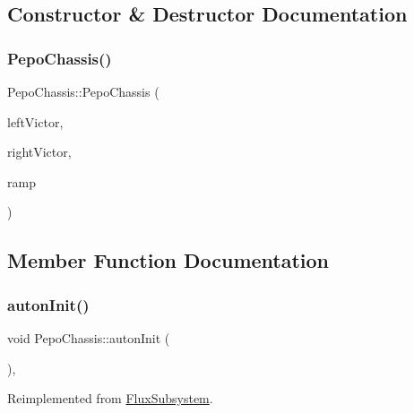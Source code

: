 \subsection{Constructor \& Destructor Documentation}
\mbox{\label{classPepoChassis_a7671239e4338a851b31322b743e1d648}} 
\subsubsection{\texorpdfstring{Pepo\+Chassis()}{PepoChassis()}}
{\footnotesize\ttfamily Pepo\+Chassis\+::\+Pepo\+Chassis (\begin{DoxyParamCaption}\item[{Victor\+S\+PX \&}]{left\+Victor,  }\item[{Victor\+S\+PX \&}]{right\+Victor,  }\item[{double}]{ramp }\end{DoxyParamCaption})}



\subsection{Member Function Documentation}
\mbox{\label{classPepoChassis_a10380f1dad79ff1daa295d0673a1051f}} 
\subsubsection{\texorpdfstring{auton\+Init()}{autonInit()}}
{\footnotesize\ttfamily void Pepo\+Chassis\+::auton\+Init (\begin{DoxyParamCaption}{ }\end{DoxyParamCaption})\hspace{0.3cm}{\ttfamily [override]}, {\ttfamily [virtual]}}



Reimplemented from \hyperlink{classFluxSubsystem_a142cb34f612412e26bd0049e037dbe60}{Flux\+Subsystem}.

\mbox{\label{classPepoChassis_ab1e73685898517c8fa2f81c5c7a6a56c}} 
